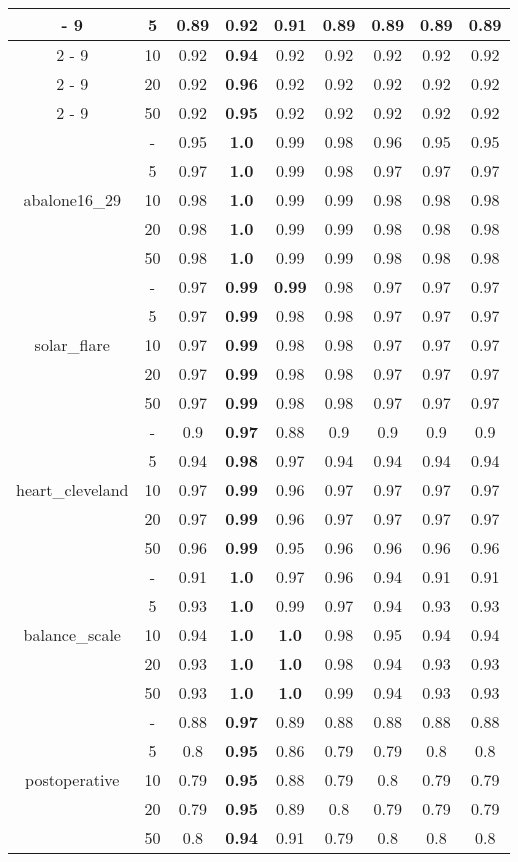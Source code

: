 \documentclass{article}%
\begin{document}
\begin{tabular}{c|c|ccccccc}
{-%
9}%
&5&0.89&\textbf{0.92}&0.91&0.89&0.89&0.89&0.89\\%
\cline{2%
-%
9}%
&10&0.92&\textbf{0.94}&0.92&0.92&0.92&0.92&0.92\\%
\cline{2%
-%
9}%
&20&0.92&\textbf{0.96}&0.92&0.92&0.92&0.92&0.92\\%
\cline{2%
-%
9}%
&50&0.92&\textbf{0.95}&0.92&0.92&0.92&0.92&0.92\\%
\hline%
\multirow{5}{*}{abalone16\_29}&{-}&0.95&\textbf{1.0}&0.99&0.98&0.96&0.95&0.95\\%
\cline{2%
-%
9}%
&5&0.97&\textbf{1.0}&0.99&0.98&0.97&0.97&0.97\\%
\cline{2%
-%
9}%
&10&0.98&\textbf{1.0}&0.99&0.99&0.98&0.98&0.98\\%
\cline{2%
-%
9}%
&20&0.98&\textbf{1.0}&0.99&0.99&0.98&0.98&0.98\\%
\cline{2%
-%
9}%
&50&0.98&\textbf{1.0}&0.99&0.99&0.98&0.98&0.98\\%
\hline%
\multirow{5}{*}{solar\_flare}&{-}&0.97&\textbf{0.99}&\textbf{0.99}&0.98&0.97&0.97&0.97\\%
\cline{2%
-%
9}%
&5&0.97&\textbf{0.99}&0.98&0.98&0.97&0.97&0.97\\%
\cline{2%
-%
9}%
&10&0.97&\textbf{0.99}&0.98&0.98&0.97&0.97&0.97\\%
\cline{2%
-%
9}%
&20&0.97&\textbf{0.99}&0.98&0.98&0.97&0.97&0.97\\%
\cline{2%
-%
9}%
&50&0.97&\textbf{0.99}&0.98&0.98&0.97&0.97&0.97\\%
\hline%
\multirow{5}{*}{heart\_cleveland}&{-}&0.9&\textbf{0.97}&0.88&0.9&0.9&0.9&0.9\\%
\cline{2%
-%
9}%
&5&0.94&\textbf{0.98}&0.97&0.94&0.94&0.94&0.94\\%
\cline{2%
-%
9}%
&10&0.97&\textbf{0.99}&0.96&0.97&0.97&0.97&0.97\\%
\cline{2%
-%
9}%
&20&0.97&\textbf{0.99}&0.96&0.97&0.97&0.97&0.97\\%
\cline{2%
-%
9}%
&50&0.96&\textbf{0.99}&0.95&0.96&0.96&0.96&0.96\\%
\hline%
\multirow{5}{*}{balance\_scale}&{-}&0.91&\textbf{1.0}&0.97&0.96&0.94&0.91&0.91\\%
\cline{2%
-%
9}%
&5&0.93&\textbf{1.0}&0.99&0.97&0.94&0.93&0.93\\%
\cline{2%
-%
9}%
&10&0.94&\textbf{1.0}&\textbf{1.0}&0.98&0.95&0.94&0.94\\%
\cline{2%
-%
9}%
&20&0.93&\textbf{1.0}&\textbf{1.0}&0.98&0.94&0.93&0.93\\%
\cline{2%
-%
9}%
&50&0.93&\textbf{1.0}&\textbf{1.0}&0.99&0.94&0.93&0.93\\%
\hline%
\multirow{5}{*}{postoperative}&{-}&0.88&\textbf{0.97}&0.89&0.88&0.88&0.88&0.88\\%
\cline{2%
-%
9}%
&5&0.8&\textbf{0.95}&0.86&0.79&0.79&0.8&0.8\\%
\cline{2%
-%
9}%
&10&0.79&\textbf{0.95}&0.88&0.79&0.8&0.79&0.79\\%
\cline{2%
-%
9}%
&20&0.79&\textbf{0.95}&0.89&0.8&0.79&0.79&0.79\\%
\cline{2%
-%
9}%
&50&0.8&\textbf{0.94}&0.91&0.79&0.8&0.8&0.8\\%
\hline%
\end{tabular}
\end{document}
